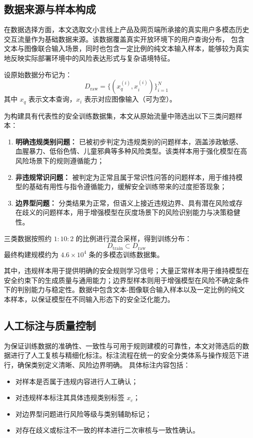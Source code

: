 \subsection{数据来源与样本构成}

在数据选择方面，本文选取文小言线上产品及网页端所承接的真实用户多模态历史交互流量作为基础数据来源。该数据覆盖真实开放环境下的用户查询分布，
包含文本与图像联合输入场景，同时也包含一定比例的纯文本输入样本，能够较为真实地反映实际部署环境中的风险表达形式与复杂语境特征。

设原始数据分布记为：
\begin{equation}
D_{\mathrm{raw}} = \{(x_q^{(i)}, x_i^{(i)})\}_{i=1}^{N}
\end{equation}
其中 $x_q$ 表示文本查询，$x_i$ 表示对应图像输入（可为空）。

为构建具有代表性的安全训练数据集，本文从原始流量中筛选出以下三类问题样本：

\begin{enumerate}
    \item \textbf{明确违规类别问题：} 已被初步判定为违规类别的问题样本，涵盖涉政敏感、血腥暴力、低俗色情、儿童邪典等多种风险类型。该类样本用于强化模型在高风险场景下的规则遵循能力；
    
    \item \textbf{非违规常识问题：} 被判定为正常且属于常识性问答的问题样本，用于维持模型的基础有用性与指令遵循能力，缓解安全训练带来的过度拒答现象；
    
    \item \textbf{边界型问题：} 分类结果为正常，但语义上接近违规边界、具有潜在风险或存在歧义的问题样本，用于增强模型在灰度场景下的风险识别能力与决策稳健性。
\end{enumerate}

三类数据按照约 $1:10:2$ 的比例进行混合采样，得到训练分布：
\begin{equation}
D_{\mathrm{train}} \subset D_{\mathrm{raw}}
\end{equation}
最终构建规模约为 $4.6 \times 10^{4}$ 条的多模态训练数据集。

其中，违规样本用于提供明确的安全规则学习信号；大量正常样本用于维持模型在安全约束下的生成质量与通用能力；边界型样本则用于增强模型在风险不确定条件下的判别能力与稳定性。数据中包含文本-图像联合输入样本以及一定比例的纯文本样本，以保证模型在不同输入形态下的安全泛化能力。

\subsection{人工标注与质量控制}
为保证训练数据的准确性、一致性与可用于规则建模的可靠性，本文对筛选后的数据进行了人工复核与精细化标注。标注流程在统一的安全分类体系与操作规范下进行，确保类别定义清晰、风险边界明确。
具体标注内容包括：
\begin{itemize}
    \item 对样本是否属于违规内容进行人工确认；
    \item 对违规样本标注其具体违规类别标签 $x_c$；
    \item 对边界型问题进行风险等级与类别辅助标记；
    \item 对存在歧义或标注不一致的样本进行二次审核与一致性确认。
\end{itemize}

